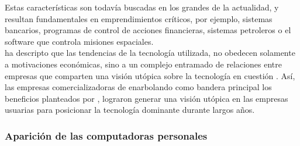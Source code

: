 Estas características son todavía buscadas en los grandes \mainframes de la actualidad,
y resultan fundamentales en emprendimientos críticos, por ejemplo, sistemas bancarios,
programas de control de acciones financieras, sistemas petroleros o el software que
controla misiones espaciales.\\
 ha descripto que las tendencias de la
tecnología utilizada, no obedecen solamente a motivaciones económicas, sino a un
complejo entramado de relaciones entre empresas que comparten una visión utópica sobre
la tecnología en cuestión . Así, las empresas
comercializadoras de \mainframes enarbolando como bandera principal los beneficios
planteados por \citeauthor{Stephens:2008:BOOK}, lograron generar una visión utópica en
las empresas usuarias para posicionar la tecnología dominante durante largos años.
 
\subsubsection{Aparición de las computadoras personales}
\label{subsubsec:intro:about_web:pc_era}

